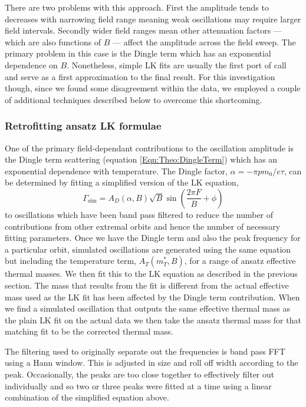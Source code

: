 There are two problems with this approach. First the amplitude tends to decreases with narrowing field range meaning weak oscillations may require larger field intervals. Secondly wider field ranges mean other attenuation factors --- which are also functions of $B$ --- affect the amplitude across the field sweep. The primary problem in this case is the Dingle term which has an exponential dependence on $B$. Nonetheless, simple \ac{LK} fits are usually the first port of call and serve as a first approximation to the final result. For this investigation though, since we found some disagreement within the data, we employed a couple of additional techniques described below to overcome this shortcoming.

\subsubsection{Retrofitting ansatz \ac{LK} formulae}
\label{Sec:Exp:LKRetrofitting}

One of the primary field-dependant contributions to the oscillation amplitude is the Dingle term scattering (equation \ref{Eqn:Theo:DingleTerm}) which has an exponential dependence with temperature. The Dingle factor, $\alpha = -\pi p m_0/e\tau$, can be determined by fitting a simplified version of the \ac{LK} equation,
\begin{equation}
    \Gamma_{\textrm{sim}} =  A_D(\alpha, B) \sqrt{B} \sin{\left(\frac{2\pi F}{B} + \phi \right)}
\end{equation}
 to oscillations which have been band pass filtered to reduce the number of contributions from other extremal orbits and hence the number of necessary fitting parameters. Once we have the Dingle term and also the peak frequency for a particular orbit, simulated oscillations are generated using the same equation but including the temperature term, $A_T(m^*_T, B)$, for a range of ansatz effective thermal masses. We then fit this to the \ac{LK} equation as described in the previous section. The mass that results from the fit is different from the actual effective mass used as the \ac{LK} fit has been affected by the Dingle term contribution. When we find a simulated oscillation that outputs the same effective thermal mass as the plain \ac{LK} fit on the actual data we then take the ansatz thermal mass for that matching fit to be the corrected thermal mass.

The filtering used to originally separate out the frequencies is band pass \ac{FFT} using a Hann window.  This is adjusted in size and roll off width according to the peak. Occasionally, the peaks are too close together to effectively filter out individually and so two or three peaks were fitted at a time using a linear combination of the simplified equation above.


